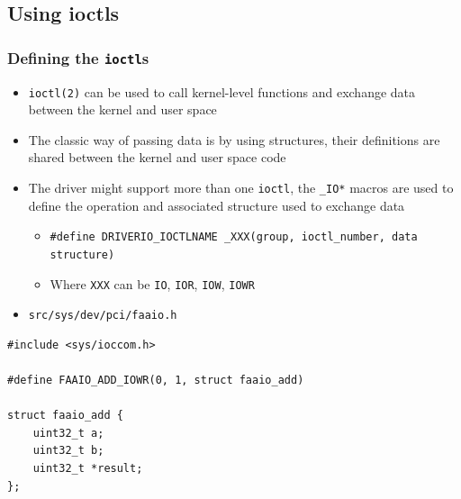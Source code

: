 \documentclass[dvipsnames,table]{beamer}
\begin{document}
\subsection{Using ioctls}

\begin{frame}[fragile]
\frametitle{Defining the {\tt ioctl}s}
\begin{itemize}
	\item {\tt ioctl(2)} can be used to call kernel-level functions and exchange data between the kernel and user space
	\item The classic way of passing data is by using structures, their definitions are shared between the kernel and user space code
	\item The driver might support more than one {\tt ioctl}, the {\tt \_IO*} macros are used to define the operation and associated structure used to exchange data
	\begin{itemize}

		\item {\tt \#define DRIVERIO\_IOCTLNAME	\_XXX(group, ioctl\_number, data structure)}
		\item Where {\tt XXX} can be {\tt IO}, {\tt IOR}, {\tt IOW}, {\tt IOWR}
	\end{itemize}
\end{itemize}

\begin{itemize}
\item {\tt src/sys/dev/pci/faaio.h}
\end{itemize}
\begin{lstlisting}
#include <sys/ioccom.h>
                     
#define FAAIO_ADD_IOWR(0, 1, struct faaio_add)

struct faaio_add {
    uint32_t a;
    uint32_t b;
    uint32_t *result;
};
\end{lstlisting}

\end{frame}
\end{document}

